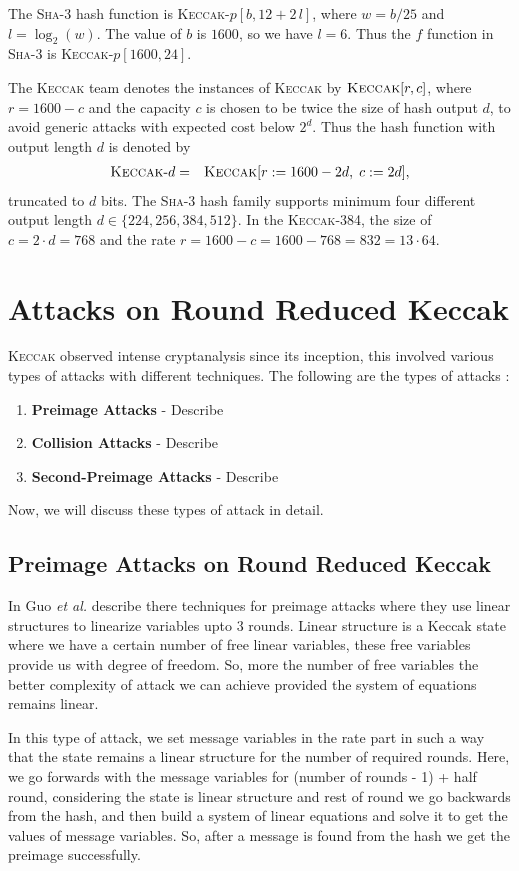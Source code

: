\documentclass[runningheads]{llncs}
\newcommand{\KECCAK}{\mbox{\textsc{Keccak}}}
\newcommand{\Keccak}{\mbox{\textsc{Keccak}}}
\newcommand{\SHA}{\textsc{Sha}}
\newcommand{\etal}{\textit{et al. }}
\begin{document}
The \SHA-3 hash function is \Keccak-$p[b, 12 + 2\,l]$, where $w = b/25$ and $l = \log_{2}(w)$. The value of $b$ is $1600$, so we have $l = 6$. Thus the $f$ function in \SHA-3 is \Keccak-$p[1600, 24]$.

The \Keccak{} team denotes the instances of \Keccak{} by $\Keccak[r,c]$, where $r=1600-c$ and the capacity $c$ is chosen to be twice the size of hash output $d$, to avoid generic attacks with expected cost below $2^d$. Thus the hash function with output length $d$ is denoted by 
\begin{eqnarray}
\mbox{\Keccak-$d$}  &=& \Keccak[r:=1600-2d,\;c:=2d],
\end{eqnarray}
truncated to $d$ bits.
The \SHA-3 hash family supports minimum four different  output length $d \in \{224,256,384,512\}$. In the \Keccak-384, the size of $c = 2\cdot d = 768$ and the rate $r = 1600 - c = 1600 - 768 = 832= 13\cdot 64$.

\section{Attacks on Round Reduced Keccak}
\KECCAK{} observed intense cryptanalysis since its inception, this involved various types of attacks with different techniques. The following are the types of attacks :
\begin{enumerate}
	\item \textbf{Preimage Attacks} - Describe
	\item \textbf{Collision Attacks} - Describe
	\item \textbf{Second-Preimage Attacks} - Describe
\end{enumerate}
Now, we will discuss these types of attack in detail.
\subsection{Preimage Attacks on Round Reduced Keccak}

In \cite{guo2016linear} Guo \etal describe there techniques for preimage attacks where they use linear structures to linearize variables upto 3 rounds. Linear structure is a Keccak state where we have a certain number of free linear variables, these free variables provide us with degree of freedom.
So, more the number of free variables the better complexity of attack we can achieve provided the system of equations remains linear.

In this type of attack, we set message variables in the rate part in such a way that the state remains a linear structure for the number of required rounds. Here, we go forwards with the message variables for (number of rounds - 1) + half round, considering the state is linear structure and rest of round we go backwards from the hash, and then build a system of linear equations and solve it to get the values of message variables. So, after a message is found from the hash we get the preimage successfully.
\end{document}
